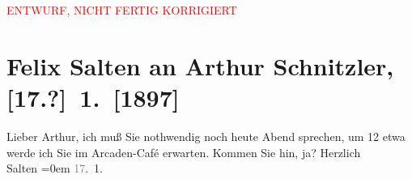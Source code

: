 
\begin{center}
            \textcolor{red}{ENTWURF, NICHT FERTIG KORRIGIERT}
                      \end{center}
            
         \renewcommand{\erwaehnteOrte}{Orte: Café Arkaden, Wien}
         \renewcommand{\erwaehnteWerke}{}
               \section[Felix Salten an Arthur Schnitzler, {[}17.?{]} 1. {[}1897{]}]{ Felix Salten an Arthur Schnitzler, {[}17.?{]} 1. {[}1897{]}}\nopagebreak{}\rehead{ }\begin{ledgroupsized}[t]{13cm}\normalsize\beginnumbering \toendnotes[C]{\smallbreak\pagebreak[2]} 
\pstart
           \noindent{}{\pb}Lieber Arthur, ich muß Sie nothwendig noch heute Abend sprechen, um
                  12 etwa werde ich Sie im Arcaden-Café erwarten. Kommen Sie hin, ja?\pend
           \pstart
           Herzlich {\\[\baselineskip]}\spacefill\mbox{Salten}\pend
           \leftskip=0em{}\pstart
           \textcolor{gray}{17}. 1.\pend
           
         
         \endnumbering{}\end{ledgroupsized}\begin{anhang}\end{anhang}\newcommand{\dateiname}{L03262}\newcommand{\titel}{Felix Salten an Arthur Schnitzler, [17.?] 1. [1897]}\newcommand{\editorInnen}{Martin Anton Müller und Laura Untner}
      